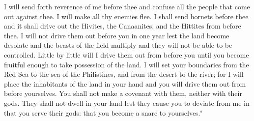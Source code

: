 \begin{inparaenum}
     I will send forth reverence of me before thee and confuse all the people that come out against thee. I will make all thy enemies flee.%
     I shall send hornets before thee and it shall drive out the Hivites, the Canaanites, and the Hittites from before thee.%
     I will not drive them out before you in one year lest the land become desolate and the beasts of the field multiply and they will not be able to be controlled.%
     Little by little will I drive them out from before you until you become fruitful enough to take possession of the land.%
     I will set your boundaries from the Red Sea to the sea of the Philistines, and from the desert to the river; for I will place the inhabitants of the land in your hand and you will drive them out from before yourselves.%
     You shall not make a covenant with them, neither with their gods.%
     They shall not dwell in your land lest they cause you to deviate from me in that you serve their gods: that you become a snare to yourselves.''%
\end{inparaenum}
